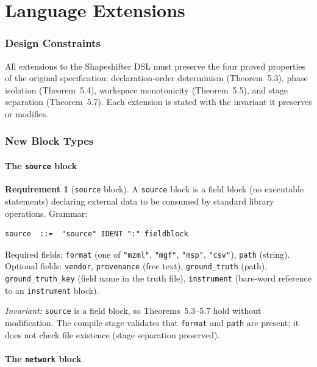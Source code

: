 \documentclass[11pt,a4paper]{article}
\theoremstyle{planstyle}
\theoremstyle{definition}
\newtheorem{requirement}[theorem]{Requirement}
\theoremstyle{remark}
\newcommand{\shk}[1]{\texttt{#1}}
\begin{document}
\part{Language Extensions}

\section{Design Constraints}
\label{sec:design-constraints}

All extensions to the Shapeshifter DSL must preserve the four proved
properties of the original specification: declaration-order determinism
(Theorem~5.3), phase isolation (Theorem~5.4), workspace monotonicity
(Theorem~5.5), and stage separation (Theorem~5.7). Each extension is
stated with the invariant it preserves or modifies.

\section{New Block Types}
\label{sec:blocks}

\subsection{The \texttt{source} block}

\begin{requirement}[\texttt{source} block]
\label{req:source}
A \shk{source} block is a field block (no executable statements)
declaring external data to be consumed by standard library operations.
Grammar:
\begin{lstlisting}
source  ::=  "source" IDENT ":" fieldblock
\end{lstlisting}
Required fields: \shk{format} (one of \shk{"mzml"}, \shk{"mgf"},
\shk{"msp"}, \shk{"csv"}), \shk{path} (string). Optional fields:
\shk{vendor}, \shk{provenance} (free text), \shk{ground\_truth} (path),
\shk{ground\_truth\_key} (field name in the truth file),
\shk{instrument} (bare-word reference to an \shk{instrument} block).

\emph{Invariant:} \shk{source} is a field block, so Theorems~5.3--5.7
hold without modification. The compile stage validates that \shk{format}
and \shk{path} are present; it does not check file existence (stage
separation preserved).
\end{requirement}

\subsection{The \texttt{network} block}
\end{document}

